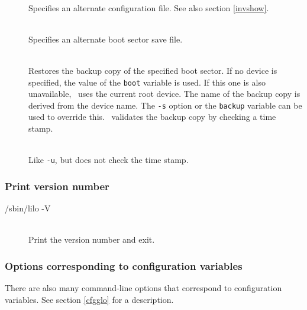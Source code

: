 \begin{description}
  \item[]~\\
    Specifies an alternate configuration file. See also section \ref{invshow}.
  \item[]~\\
    Specifies an alternate boot sector save file. \seealso
  \item[]~ \\
    Restores the backup copy of the specified boot sector. If no device is
    specified, the value of the \verb"boot" variable is used. If this one
    is also unavailable, \LILO\ uses the current root device. The name of
    the backup copy is derived from the device name. The \verb"-s" option
    or the \verb"backup" variable can be used to override this.
    \LILO\ validates the backup copy by checking a time stamp.
  \item[]~ \\
    Like \verb"-u", but does not check the time stamp.
\end{description}


\subsubsection{Print version number}

\begin{command}
  /sbin/lilo -V
\end{command}

\begin{description}
  \item[]~ \\
    Print the version number and exit.
\end{description}


\subsubsection{Options corresponding to configuration variables}
\label{corropt}

There are also many command-line options that correspond to configuration
variables. See section \ref{cfgglo} for a description.

